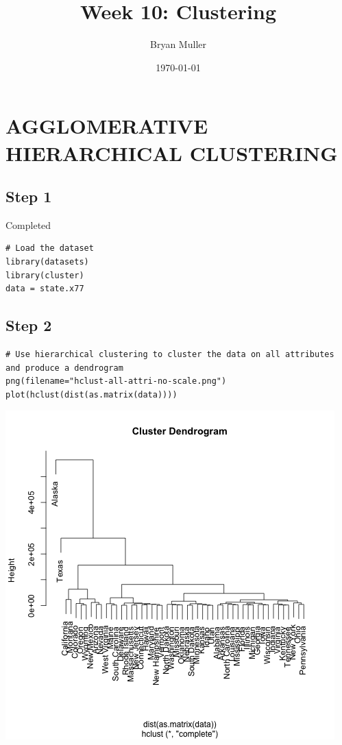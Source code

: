 \documentclass[11pt]{article}
\author{Bryan Muller}
\date{\today}
\title{Week 10: Clustering}
\begin{document}
\maketitle

\section*{AGGLOMERATIVE HIERARCHICAL CLUSTERING}
\label{sec:org607ea3c}
\subsection*{Step 1}
\label{sec:orgc1f7535}
Completed
\begin{verbatim}
# Load the dataset
library(datasets)
library(cluster)
data = state.x77
\end{verbatim}
\subsection*{Step 2}
\label{sec:orgab31822}
\begin{verbatim}
# Use hierarchical clustering to cluster the data on all attributes and produce a dendrogram
png(filename="hclust-all-attri-no-scale.png")
plot(hclust(dist(as.matrix(data))))
\end{verbatim}

\begin{center}
\includegraphics[width=.9\linewidth]{hclust-all-attri-no-scale.png}
\end{center}
\end{document}
